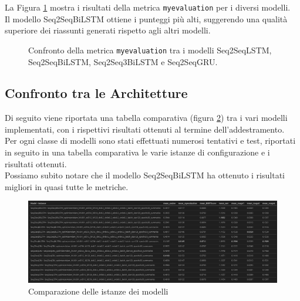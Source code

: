 La Figura \ref{fig:myevaluation_comparison} mostra i risultati della metrica \texttt{myevaluation} per i diversi modelli.\\
Il modello Seq2SeqBiLSTM ottiene i punteggi pi\`u alti, suggerendo una qualit\`a superiore dei riassunti generati rispetto agli altri modelli.
\begin{figure}[H]
    \centering
    \hfill
    \hfill
    \hfill
    \hfill

    \caption{Confronto della metrica \texttt{myevaluation} tra i modelli Seq2SeqLSTM, Seq2SeqBiLSTM, Seq2Seq3BiLSTM e Seq2SeqGRU.}
    \label{fig:myevaluation_comparison}
\end{figure}

\subsection{Confronto tra le Architetture}
Di seguito viene riportata una tabella comparativa (figura \ref{fig:models_comparison_instances}) tra i vari modelli implementati, con i rispettivi risultati ottenuti al termine dell'addestramento.\\
Per ogni classe di modelli sono stati effettuati numerosi tentativi e test, riportati in seguito in una tabella comparativa le varie istanze di configurazione e i risultati ottenuti.\\
Possiamo subito notare che il modello Seq2SeqBiLSTM ha ottenuto i risultati migliori in quasi tutte le metriche.
\begin{figure}[H]
    \centering
    \includegraphics[width=1\textwidth]{media/models_comparison_instances.png}
    \caption{Comparazione delle istanze dei modelli}
    \label{fig:models_comparison_instances}
\end{figure}

